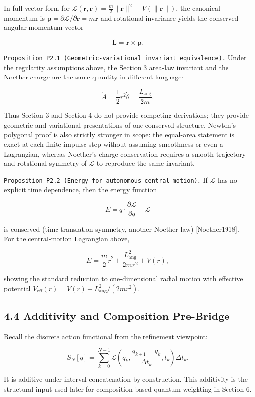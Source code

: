 \documentclass[
]{article}
\begin{document}
In full vector form for
\(\mathcal L(\mathbf r,\dot{\mathbf r})=\frac{m}{2}\|\dot{\mathbf r}\|^2-V(\|\mathbf r\|)\),
the canonical momentum is
\(\mathbf p=\partial\mathcal L/\partial\dot{\mathbf r}=m\dot{\mathbf r}\)
and rotational invariance yields the conserved angular momentum vector

\[
\mathbf L=\mathbf r\times\mathbf p.
\]

\texttt{Proposition\ P2.1\ (Geometric-variational\ invariant\ equivalence).}
Under the regularity assumptions above, the Section 3 area-law invariant
and the Noether charge are the same quantity in different language:

\[
\dot A=\frac12 r^2\dot\theta=\frac{L_{\mathrm{ang}}}{2m}.
\]

Thus Section 3 and Section 4 do not provide competing derivations; they
provide geometric and variational presentations of one conserved
structure. Newton's polygonal proof is also strictly stronger in scope:
the equal-area statement is exact at each finite impulse step without
assuming smoothness or even a Lagrangian, whereas Noether's charge
conservation requires a smooth trajectory and rotational symmetry of
\(\mathcal L\) to reproduce the same invariant.

\texttt{Proposition\ P2.2\ (Energy\ for\ autonomous\ central\ motion).}
If \(\mathcal L\) has no explicit time dependence, then the energy
function

\[
E=\dot q\cdot\frac{\partial\mathcal L}{\partial\dot q}-\mathcal L
\]

is conserved (time-translation symmetry, another Noether law)
{[}Noether1918{]}. For the central-motion Lagrangian above,

\[
E=\frac{m}{2}\dot r^2+\frac{L_{\mathrm{ang}}^2}{2mr^2}+V(r),
\]

showing the standard reduction to one-dimensional radial motion with
effective potential
\(V_{\mathrm{eff}}(r)=V(r)+L_{\mathrm{ang}}^2/(2mr^2)\).

\subsection{4.4 Additivity and Composition
Pre-Bridge}\label{additivity-and-composition-pre-bridge}

Recall the discrete action functional from the refinement viewpoint:

\[
S_N[q]=\sum_{k=0}^{N-1}
\mathcal L\!\left(q_k,\frac{q_{k+1}-q_k}{\Delta t_k},t_k\right)\Delta t_k.
\]

It is additive under interval concatenation by construction. This
additivity is the structural input used later for composition-based
quantum weighting in Section 6.
\end{document}
